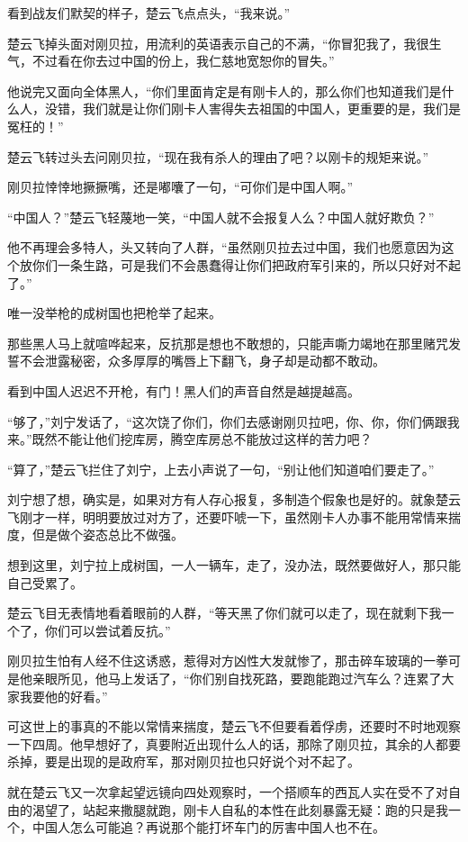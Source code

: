 看到战友们默契的样子，楚云飞点点头，“我来说。”

楚云飞掉头面对刚贝拉，用流利的英语表示自己的不满，“你冒犯我了，我很生气，不过看在你去过中国的份上，我仁慈地宽恕你的冒失。”

他说完又面向全体黑人，“你们里面肯定是有刚卡人的，那么你们也知道我们是什么人，没错，我们就是让你们刚卡人害得失去祖国的中国人，更重要的是，我们是冤枉的！”

楚云飞转过头去问刚贝拉，“现在我有杀人的理由了吧？以刚卡的规矩来说。”

刚贝拉悻悻地撅撅嘴，还是嘟囔了一句，“可你们是中国人啊。”

“中国人？”楚云飞轻蔑地一笑，“中国人就不会报复人么？中国人就好欺负？”

他不再理会多特人，头又转向了人群，“虽然刚贝拉去过中国，我们也愿意因为这个放你们一条生路，可是我们不会愚蠢得让你们把政府军引来的，所以只好对不起了。”

唯一没举枪的成树国也把枪举了起来。

那些黑人马上就喧哗起来，反抗那是想也不敢想的，只能声嘶力竭地在那里赌咒发誓不会泄露秘密，众多厚厚的嘴唇上下翻飞，身子却是动都不敢动。

看到中国人迟迟不开枪，有门！黑人们的声音自然是越提越高。

“够了，”刘宁发话了，“这次饶了你们，你们去感谢刚贝拉吧，你、你，你们俩跟我来。”既然不能让他们挖库房，腾空库房总不能放过这样的苦力吧？

“算了，”楚云飞拦住了刘宁，上去小声说了一句，“别让他们知道咱们要走了。”

刘宁想了想，确实是，如果对方有人存心报复，多制造个假象也是好的。就象楚云飞刚才一样，明明要放过对方了，还要吓唬一下，虽然刚卡人办事不能用常情来揣度，但是做个姿态总比不做强。

想到这里，刘宁拉上成树国，一人一辆车，走了，没办法，既然要做好人，那只能自己受累了。

楚云飞目无表情地看着眼前的人群，“等天黑了你们就可以走了，现在就剩下我一个了，你们可以尝试着反抗。”

刚贝拉生怕有人经不住这诱惑，惹得对方凶性大发就惨了，那击碎车玻璃的一拳可是他亲眼所见，他马上发话了，“你们别自找死路，要跑能跑过汽车么？连累了大家我要他的好看。”

可这世上的事真的不能以常情来揣度，楚云飞不但要看着俘虏，还要时不时地观察一下四周。他早想好了，真要附近出现什么人的话，那除了刚贝拉，其余的人都要杀掉，要是出现的是政府军，那对刚贝拉也只好说个对不起了。

就在楚云飞又一次拿起望远镜向四处观察时，一个搭顺车的西瓦人实在受不了对自由的渴望了，站起来撒腿就跑，刚卡人自私的本性在此刻暴露无疑：跑的只是我一个，中国人怎么可能追？再说那个能打坏车门的厉害中国人也不在。

